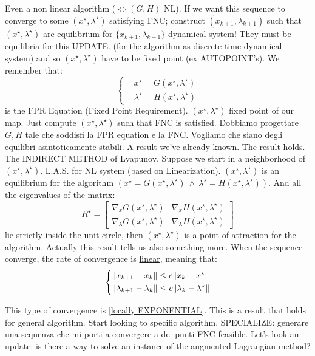 Even a non linear algorithm ($\iff (G,H)$ NL). If we want this sequence to converge to some $(x^\star,\lambda^\star)$ satisfying FNC; construct $(x_{k+1},\lambda_{k+1})$ such that $(x^\star,\lambda^\star)$ are equilibrium for $\{x_{k+1},\lambda_{k+1}\}$ dynamical system! They must be equilibria for this UPDATE. (for the algorithm as discrete-time dynamical system) and so $(x^\star,\lambda^\star)$ have to be fixed point (ex AUTOPOINT's). We remember that:
\[
	\left\{
	\begin{aligned}
	&x^\star = G(x^\star,\lambda^\star)\\
	&\lambda^\star = H(x^\star,\lambda^\star)
	\end{aligned}
	\right.
\]
is the FPR Equation (Fixed Point Requirement). $(x^\star,\lambda^\star)$ fixed point of our map. Just compute $(x^\star,\lambda^\star)$ such that FNC is satisfied. Dobbiamo progettare $G,H$ tale che soddisfi la FPR equation e la FNC. Vogliamo che siano degli equilibri \underline{asintoticamente stabili}. A result we've already known. The result holds. The INDIRECT METHOD of Lyapunov. Suppose we start in a neighborhood of $(x^\star,\lambda^\star)$. L.A.S. for NL system (based on Linearization). $(x^\star,\lambda^\star)$ is an equilibrium for the algorithm $(x^\star=G(x^\star,\lambda^\star)\ \land\ \lambda^\star=H(x^\star,\lambda^\star))$. And all the eigenvalues of the matrix:
\[
	R^\star = \begin{bmatrix}\nabla_x{G(x^\star,\lambda^\star)} & \nabla_x{H(x^\star,\lambda^\star)}\\
	\nabla_\lambda{G(x^\star,\lambda^\star)} & \nabla_\lambda{H(x^\star,\lambda^\star)}\end{bmatrix}
\]
lie strictly inside the unit circle, then $(x^\star,\lambda^\star)$ is a point of attraction for the algorithm. Actually this result tells us also something more. When the sequence converge, the rate of convergence is \underline{linear}, meaning that:
\[
	\left\{
	\begin{aligned}
	&\lVert x_{k+1}-x_k\rVert \leq c\lVert x_k-x^\star\rVert\\
	&\lVert\lambda_{k+1}-\lambda_k\rVert \leq c\lVert\lambda_k-\lambda^\star\rVert
	\end{aligned}
	\right.
\]

This type of convergence is [\underline{locally EXPONENTIAL}].
This is a result that holds for general algorithm. Start looking to specific algorithm. SPECIALIZE:
generare una sequenza che mi porti a convergere a dei punti FNC-feasible. Let's look an update: is there a way to solve an instance of the augmented Lagrangian method?

